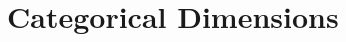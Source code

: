 \documentclass[letterpaper]{article}
\newcommand{\vect}[1]{\underline{\smash{#1}}}
\renewcommand{\v}[1]{\vect{#1}}
\newcommand{\sX}{\mathcal{X}}
\newcommand{\br}{^{\text{\textnormal{ r}}}}
\newcommand{\cat}{^{\text{\textnormal{c}}}}
\begin{document}
% 
% 
% 
% 







\section{Categorical Dimensions}
\end{document}
